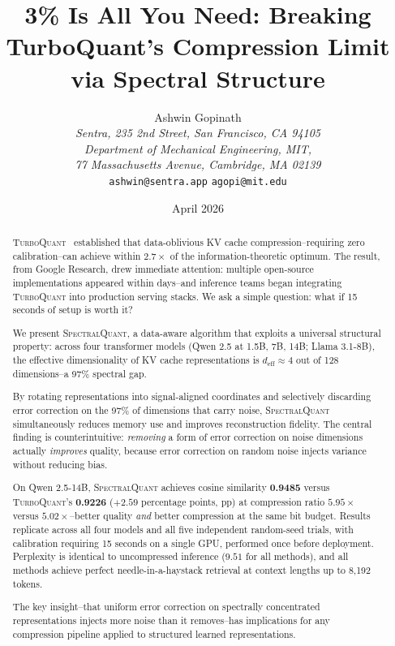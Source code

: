 \documentclass[11pt]{article}
\title{\textbf{3\% Is All You Need: Breaking TurboQuant's Compression Limit via Spectral Structure}}
\author{%
  Ashwin Gopinath\\[4pt]
  \textit{Sentra, 235 2nd Street, San Francisco, CA 94105}\\
  \textit{Department of Mechanical Engineering, MIT,}\\
  \textit{77 Massachusetts Avenue, Cambridge, MA 02139}\\[4pt]
  \texttt{ashwin@sentra.app} \quad \texttt{agopi@mit.edu}
}
\date{April 2026}
\newcommand{\deff}{d_{\mathrm{eff}}}
\newcommand{\TQ}{\textsc{TurboQuant}}
\newcommand{\SQ}{\textsc{SpectralQuant}}
\begin{document}
\maketitle

\begin{abstract}

\TQ{}~\citep{zandieh2025turboquant} established that data-oblivious KV cache
compression--requiring zero calibration--can achieve within $2.7\times$ of
the information-theoretic optimum.  The result, from Google Research, drew
immediate attention: multiple open-source implementations appeared within
days--and inference teams began integrating \TQ{} into production serving
stacks.  We ask a simple question: what if 15 seconds of setup is worth it?

We present \SQ{}, a data-aware algorithm that exploits a universal structural
property: across four transformer models (Qwen 2.5 at 1.5B, 7B, 14B; Llama
3.1-8B), the effective dimensionality of KV cache representations is
$\deff \approx 4$ out of 128 dimensions--a 97\% spectral gap.

By rotating representations into signal-aligned coordinates and selectively
discarding error correction on the 97\% of dimensions that carry noise,
\SQ{} simultaneously reduces memory use and improves reconstruction fidelity.
The central finding is counterintuitive: \emph{removing} a form of error
correction on noise dimensions actually \emph{improves} quality, because
error correction on random noise injects variance without reducing bias.

On Qwen 2.5-14B, \SQ{} achieves cosine similarity \textbf{0.9485} versus
\TQ{}'s \textbf{0.9226} ($+2.59$ percentage points, pp) at compression ratio $5.95\times$ versus
$5.02\times$--better quality \emph{and} better compression at the same bit
budget.  Results replicate across all four models and all five independent
random-seed trials, with calibration requiring 15 seconds on a single GPU,
performed once before deployment.  Perplexity is identical to uncompressed
inference ($9.51$ for all methods), and all methods achieve perfect
needle-in-a-haystack retrieval at context lengths up to 8{,}192 tokens.

The key insight--that uniform error correction on spectrally concentrated
representations injects more noise than it removes--has implications for any
compression pipeline applied to structured learned representations.

\end{abstract}
\end{document}
